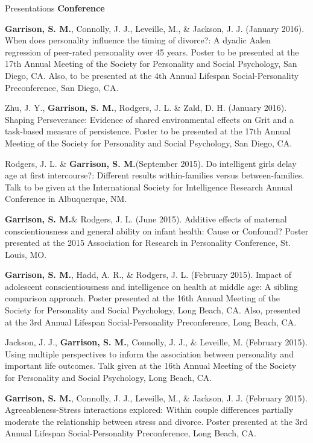 \documentclass {resume}
\newlength{\wideitemsep}
\let\olditem\item
\renewcommand{\item}{\setlength{\itemsep}{\wideitemsep}\olditem}
\newcommand{\meb}{{\bf Garrison, S. M.}\xspace}
\begin{document}
\begin{rSection}{\textrm{Presentations}}
{\large {\bf Conference}}\begin{etaremune}
\item \meb, Connolly, J. J., Leveille, M., \& Jackson, J. J. (January 2016). When does personality influence the timing of divorce?: A dyadic Aalen regression of peer-rated personality over 45 years. Poster to be presented at the 17th Annual Meeting of the Society for Personality and Social Psychology, San Diego, CA. Also, to be presented at the 4th Annual Lifespan Social-Personality  Preconference, San Diego, CA.
\item Zhu, J. Y., \meb, Rodgers, J. L. \& Zald, D. H. (January 2016). Shaping Perseverance: Evidence of shared environmental effects on Grit and a task-based measure of persistence. Poster to be presented at the 17th Annual Meeting of the Society for Personality and Social Psychology, San Diego, CA.
\item Rodgers, J. L. \& \meb (September 2015). Do intelligent girls delay age at first intercourse?:  Different results within-families versus between-families. Talk to be given at the International Society for Intelligence Research Annual Conference in Albuquerque, NM.
\item \meb \& Rodgers, J. L. (June 2015). Additive effects of maternal conscientiousness and general ability on infant health: Cause or Confound? Poster presented at the 2015 Association for Research in Personality Conference, St. Louis, MO.%
\item \meb, Hadd, A. R., \& Rodgers, J. L. (February 2015). Impact of adolescent conscientiousness and intelligence on health at middle age: A sibling comparison approach. Poster presented at the 16th Annual Meeting of the Society for Personality and  Social Psychology, Long Beach, CA. Also, presented at the 3rd Annual Lifespan Social-Personality Preconference, Long Beach, CA.
\item Jackson, J. J., \textbf{Garrison, S. M.}, Connolly, J. J., \& Leveille, M. (February 2015). Using multiple perspectives to inform the association between personality and important life outcomes. Talk given at the 16th Annual Meeting of the Society for Personality and  Social Psychology, Long Beach, CA.
\item\meb, Connolly, J. J., Leveille, M., \& Jackson, J. J. (February 2015). Agreeableness-Stress interactions explored: Within couple differences partially moderate the relationship between stress and divorce. Poster presented at the 3rd Annual Lifespan Social-Personality Preconference, Long Beach, CA.

\end{etaremune}
\end{rSection}
\end{document}
